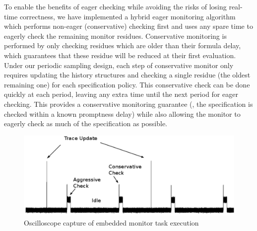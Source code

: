 To enable the benefits of eager checking while avoiding the risks of losing real-time correctness, we have implemented a hybrid eager monitoring algorithm which performs non-eager (conservative) checking first and uses any spare time to eagerly check the remaining monitor residues.
%
Conservative \monitor monitoring is performed by only checking residues which are older than their formula delay, which guarantees that these residue will be reduced at their first evaluation.
%
Under our periodic sampling design, each step of conservative monitor only requires updating the history structures and checking a single residue (the oldest remaining one) for each specification policy.
%
This conservative check can be done quickly at each period, leaving any extra time until the next period for eager checking. This provides a conservative monitoring guarantee (\ie, the specification is checked within a known promptness delay) while also allowing the monitor to eagerly check as much of the specification as possible.


\begin{figure}[t]
\centering 
\includegraphics[width=4.5in]{img/scope_annotated_crop}
\caption{Oscilloscope capture of embedded monitor task execution \label{fig:arch:oscope}}
\end{figure}

